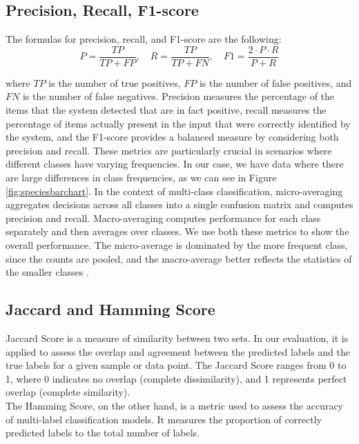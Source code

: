\documentclass{article}
\begin{document}
\subsection{Precision, Recall, F1-score}

The formulas for precision, recall, and F1-score are the following: \[ P = \frac{TP}{TP + FP}, \quad R = \frac{TP}{TP + FN}, \quad F1 = \frac{2 \cdot P \cdot R}{P + R} \]

where \(TP\) is the number of true positives, \(FP\) is the number of false positives, and \(FN\) is the number of false negatives. Precision measures the percentage of the items that the system detected that are in fact positive, recall measures the percentage of items actually present in the input that were correctly identified by the system, and the F1-score provides a balanced measure by considering both precision and recall. These metrics are particularly crucial in scenarios where different classes have varying frequencies. In our case, we have data where there are large differences in class frequencies, as we can see in Figure \ref{fig:speciesbarchart}. In the context of multi-class classification, micro-averaging aggregates decisions across all classes into a single confusion matrix and computes precision and recall. Macro-averaging computes performance for each class separately and then averages over classes. We use both these metrics to show the overall performance. The micro-average is dominated by the more frequent class, since the counts are pooled, and the macro-average better reflects the statistics of the smaller classes \cite{jm3}. 







\subsection{Jaccard and Hamming Score}
Jaccard Score is a measure of similarity between two sets. In our evaluation, it is applied to assess the overlap and agreement between the predicted labels and the true labels for a given sample or data point. The Jaccard Score ranges from 0 to 1, where 0 indicates no overlap (complete dissimilarity), and 1 represents perfect overlap (complete similarity). \\
The Hamming Score, on the other hand, is a metric used to assess the accuracy of multi-label classification models. It measures the proportion of correctly predicted labels to the total number of labels.
\end{document}

